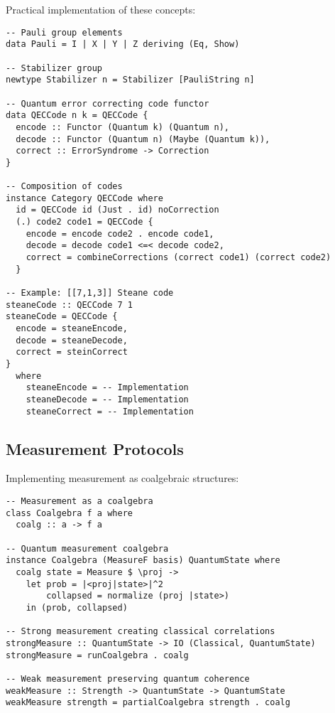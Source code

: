 Practical implementation of these concepts:

\begin{example}
\begin{verbatim}
-- Pauli group elements
data Pauli = I | X | Y | Z deriving (Eq, Show)

-- Stabilizer group
newtype Stabilizer n = Stabilizer [PauliString n]

-- Quantum error correcting code functor
data QECCode n k = QECCode {
  encode :: Functor (Quantum k) (Quantum n),
  decode :: Functor (Quantum n) (Maybe (Quantum k)),
  correct :: ErrorSyndrome -> Correction
}

-- Composition of codes
instance Category QECCode where
  id = QECCode id (Just . id) noCorrection
  (.) code2 code1 = QECCode {
    encode = encode code2 . encode code1,
    decode = decode code1 <=< decode code2,
    correct = combineCorrections (correct code1) (correct code2)
  }

-- Example: [[7,1,3]] Steane code
steaneCode :: QECCode 7 1
steaneCode = QECCode {
  encode = steaneEncode,
  decode = steaneDecode,
  correct = steinCorrect
}
  where
    steaneEncode = -- Implementation
    steaneDecode = -- Implementation  
    steaneCorrect = -- Implementation
\end{verbatim}
\end{example}

\subsection{Measurement Protocols}

Implementing measurement as coalgebraic structures:

\begin{example}
\begin{verbatim}
-- Measurement as a coalgebra
class Coalgebra f a where
  coalg :: a -> f a

-- Quantum measurement coalgebra  
instance Coalgebra (MeasureF basis) QuantumState where
  coalg state = Measure $ \proj ->
    let prob = |<proj|state>|^2
        collapsed = normalize (proj |state>)
    in (prob, collapsed)

-- Strong measurement creating classical correlations
strongMeasure :: QuantumState -> IO (Classical, QuantumState)
strongMeasure = runCoalgebra . coalg

-- Weak measurement preserving quantum coherence
weakMeasure :: Strength -> QuantumState -> QuantumState
weakMeasure strength = partialCoalgebra strength . coalg
\end{verbatim}
\end{example}


